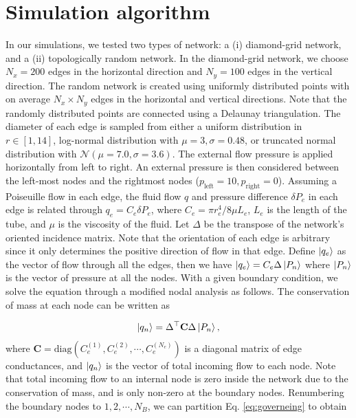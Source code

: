 \documentclass[%
 amsmath,amssymb,
prstper,
]{revtex4-2}
\begin{document}
\section{Simulation algorithm}
%
In our simulations, we tested two types of network: a (i) diamond-grid network, and a (ii) topologically random network. In the diamond-grid network, we choose $N_x=200$ edges in the horizontal direction and $N_y=100$ edges in the vertical direction. The random network is created using uniformly distributed points with on average $N_x\times N_y$ edges in the horizontal and vertical directions. Note that the randomly distributed points are connected using a Delaunay triangulation. The diameter of each edge is sampled from either a uniform distribution in $r\in[1,14]$, log-normal distribution with $\mu=3,\sigma=0.48$, or truncated normal distribution with $\mathcal{N}(\mu=7.0,\sigma=3.6)$.   The external flow pressure is applied horizontally from left to right. An external pressure is then considered between the left-most nodes and the rightmost nodes ($p_\text{left}=10,p_\text{right}=0$). Assuming a Poiseuille flow in each edge, the fluid flow $q$ and pressure difference $\delta P_e$ in each edge is related through $q_e = C_e \delta P_e$, where $C_e = \pi r^4_e/8\mu L_e$,  $L_e$ is the length of the tube, and $\mu$ is the viscosity of the fluid. Let $\Delta$ be the transpose of the network's oriented incidence matrix. Note that the orientation of each edge is arbitrary since it only determines the positive direction of flow in that edge. Define $\ket{q_e}$ as the vector of flow through all the edges, then we have $\ket{q_e} = C_e\Delta \ket{P_n}$ where $\ket{P_n}$ is the vector of pressure at all the nodes. With a given boundary condition, we solve the equation through a modified nodal analysis as follows. The conservation of mass at each node can be written as 
%

\begin{align}
    \ket{q_n} = \Delta^\top \mathbf{C} \Delta \ket{P_n}, \label{eq:governeing}
\end{align}
%
where $\mathbf{C} = \text{diag}\left( C^{(1)}_e, C^{(2)}_e, \cdots,C^{(N_e)}_e\right)$ is a diagonal matrix of edge conductances, and $\ket{q_n}$ is the vector of total incoming flow to each node. Note that total incoming flow to an internal node is zero inside the network due to the conservation of mass, and is only non-zero at the boundary nodes. Renumbering the boundary nodes to $1,2,\cdots, N_{B}$, we can partition Eq. \eqref{eq:governeing} to obtain 
\end{document}
